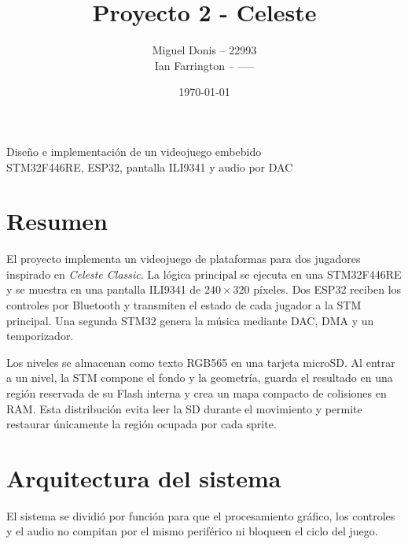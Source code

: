 \documentclass[11pt,letterpaper]{article}
\title{\textbf{Proyecto 2 - Celeste}}
\author{Miguel Donis -- 22993\\Ian Farrington -- -----}
\date{\today}
\begin{document}
\maketitle
\thispagestyle{empty}
\vfill

\begin{center}
  \large Diseño e implementación de un videojuego embebido\\[0.5em]
  \normalsize STM32F446RE, ESP32, pantalla ILI9341 y audio por DAC
\end{center}

\vfill
\newpage

\tableofcontents
\newpage

\section{Resumen}

El proyecto implementa un videojuego de plataformas para dos jugadores inspirado en
\textit{Celeste Classic}. La lógica principal se ejecuta en una STM32F446RE y se
muestra en una pantalla ILI9341 de $240\times320$ píxeles. Dos ESP32 reciben los
controles por Bluetooth y transmiten el estado de cada jugador a la STM principal.
Una segunda STM32 genera la música mediante DAC, DMA y un temporizador.

Los niveles se almacenan como texto RGB565 en una tarjeta microSD. Al entrar a un
nivel, la STM compone el fondo y la geometría, guarda el resultado en una región
reservada de su Flash interna y crea un mapa compacto de colisiones en RAM. Esta
distribución evita leer la SD durante el movimiento y permite restaurar únicamente
la región ocupada por cada sprite.

\section{Arquitectura del sistema}

El sistema se dividió por función para que el procesamiento gráfico, los controles y
el audio no compitan por el mismo periférico ni bloqueen el ciclo del juego.
\end{document}
